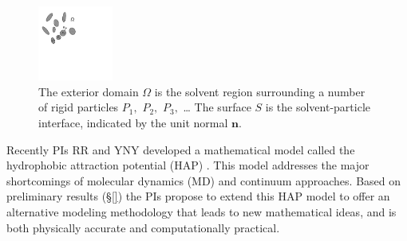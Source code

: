\begin{figure}
\centerline{\includegraphics[width=0.22\textwidth]{figures/BG_fig1.pdf}}
\caption{The exterior domain $\Omega$ is the solvent region surrounding a
number of rigid particles $P_1,$ $P_2,$ $P_3,$ \dots 
The surface $S$ is the solvent-particle interface, indicated by the unit
normal $\mathbf{n}.$ }\label{fig:domain}
\end{figure}
Recently PIs RR and YNY developed a mathematical model called the 
hydrophobic attraction potential (HAP) \cite{Fu2018_SIAM}.
This model addresses the major shortcomings of molecular dynamics (MD) and continuum approaches. Based on preliminary results (\S\ref{})
the PIs propose to extend this HAP model to offer
 an alternative modeling methodology that leads to new mathematical ideas,
and is both physically accurate and computationally practical.
%
%
%
%
